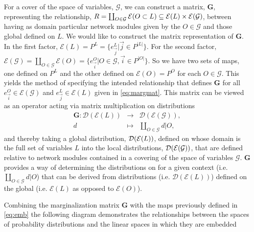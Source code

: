 \noindent\makebox[\linewidth]{\rule{\paperwidth}{0.4pt}}

For a cover of the space of variables, $\mathcal{G}$, we can construct a matrix, $\mathbf{G}$, representing the relationship, $R = \coprod_{O \in \mathcal{G}} \mathcal{E}(O \subset L) \subseteq \mathcal{E}(L) \times \mathcal{E} (\mathcal{G})$, between \gnpm{} having as domain particular network modules given by the $O \in \mathcal{G}$ and those global \gnpm{} defined on $L$. We would like to construct the matrix representation of $\mathbf{G}$. In the first factor, $\mathcal{E}(L) = P^L = \{e^{L}_{\vec{j}} | \vec{j} \in P^{|L|}\}$.
For the second factor, $ \mathcal{E}(\mathcal{G}) = \coprod_{O \in \mathcal{G}} \mathcal{E}(O) = \{e^O_{\vec{i}} | O \in \mathcal{G}, \vec{i} \in P^{|O|} \}$.
 So we have two sets of maps, one defined on $P^L$ and the other defined on $\mathcal{E}(O) = P^O$ for each $O \in \mathcal{G}$. This yields the method of specifying the intended relationship that defines $\mathbf{G}$ for all $e^O_{\vec{i}} \in \mathcal{E}(\mathcal{G})$ and $e^{L}_{\vec{j}} \in \mathcal{E}(L)$ given in \autoref{eq:margmat}.
This matrix can be viewed as an operator acting via matrix multiplication on distributions
\begin{eqnarray*}
\mathbf{G} \colon \mathcal{D}(\mathcal{E}(L)) &\rightarrow& \mathcal{D}( \mathcal{E}(\mathcal{G})),\\
d &\mapsto& \coprod_{O \in \mathcal{G}} d|O,
\end{eqnarray*}
and thereby taking a global distribution, $\mathcal{D} (\mathcal{E}(L))$, defined on \gnpm{} whose domain is the full set of variables $L$ into the local distributions, $\mathcal{D} (\mathcal{E}(\mathcal{G}))$, that are defined relative to network modules contained in a covering of the space of variables $\mathcal{G}$. $\mathbf{G}$ provides a way of determining the distributions on \gnpm{} for a given context (i.e. $\coprod_{O \in \mathcal{G}} d|O$) that can be derived from distributions (i.e. $\mathcal{D} ( \mathcal{E}(L) )$) defined on the global \gnpm{} (i.e. $\mathcal{E}(L)$ as opposed to $\mathcal{E}(O)$).

Combining the marginalization matrix $\mathbf{G}$ with the maps previously defined in \autoref{eq:emb} the following diagram demonstrates the relationships between the spaces of probability distributions and the linear spaces in which they are embedded

